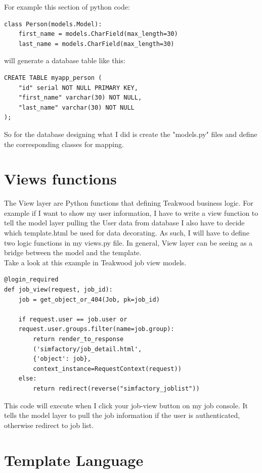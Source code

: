 For example this section of python code:
\begin{verbatim}
class Person(models.Model):
    first_name = models.CharField(max_length=30)
    last_name = models.CharField(max_length=30)
\end{verbatim}

will generate a database table like this:
\begin{verbatim}
CREATE TABLE myapp_person (
    "id" serial NOT NULL PRIMARY KEY,
    "first_name" varchar(30) NOT NULL,
    "last_name" varchar(30) NOT NULL
);
\end{verbatim}

So for the database designing what I did is create the "models.py" files and define the corresponding classes for mapping.

\section{Views functions}
The View layer are Python functions that defining Teakwood business logic. For example if I want to show my user information, I have  to write a view function to tell the model layer pulling the User data from database I also have to decide which template.html be used for data decorating. As such, I will have to define two logic functions in my views.py file. In general, View layer can be seeing as a bridge between the model and the template. \\

Take a look at this example in Teakwood job view models.
\begin{verbatim}
@login_required
def job_view(request, job_id):
    job = get_object_or_404(Job, pk=job_id)

    if request.user == job.user or 
    request.user.groups.filter(name=job.group):
        return render_to_response
        ('simfactory/job_detail.html',
        {'object': job},
        context_instance=RequestContext(request))
    else:
        return redirect(reverse("simfactory_joblist"))
\end{verbatim}

This code will execute when I click your job-view button on my job console. It tells the model layer to pull the job information if the user is authenticated, otherwise redirect to job list.

\section{Template Language}


